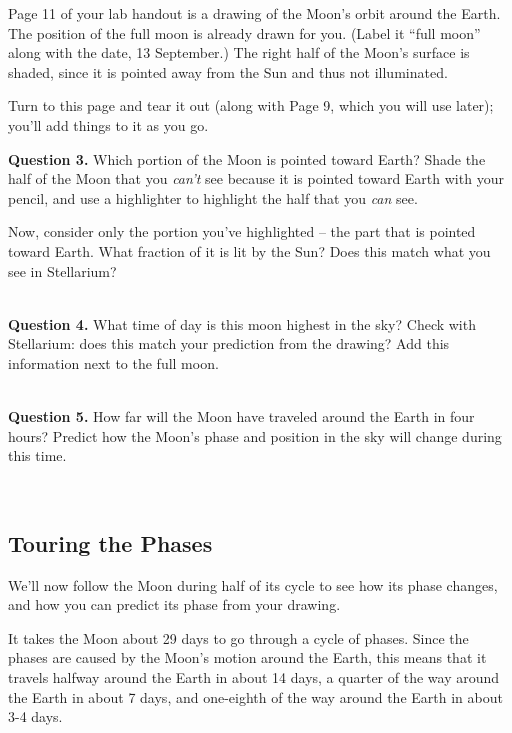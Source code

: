 \documentclass[11pt]{article}
\begin{document}
\newpage


Page 11 of your lab handout is a drawing of the Moon's orbit around the Earth. The position 
of the full moon is already drawn for you. (Label it ``full moon'' along with the date, 13 September.) The right half of the Moon's surface is shaded, since it is pointed away from the Sun and thus not illuminated.

Turn to this page and tear it out (along with Page 9, which you will use later); you'll add things to it as you go.\vspace{1cm}

\textbf{Question 3.} Which portion of the Moon is pointed toward Earth? Shade the half of the Moon that you {\it can't}
see because it is pointed toward Earth with your pencil, and use a highlighter to highlight the half that you {\it can} see.

Now, consider only the portion you've highlighted -- the part that is pointed toward Earth. What fraction of it is lit 
by the Sun? Does this match what you see in Stellarium?

\vspace*{1.5cm}

\hrulefill\\

\textbf{Question 4.} What time of day is this moon highest in the sky? Check with Stellarium: does this match your 
prediction from the drawing? Add this information next to the full moon.

\vspace*{1.5cm}

\hrulefill\\

\textbf{Question 5.} How far will the Moon have traveled around the Earth in four hours? Predict how the Moon's phase and position
in the sky will change during this time. 

\vspace*{1.5cm}

\hrulefill\\


\subsection{Touring the Phases}


We'll now follow the Moon during half of its cycle to see how its phase changes, and how you can predict its phase from your drawing.

It takes the Moon about 29 days to go through a cycle of phases. Since the phases are caused by the Moon's motion around the Earth,
this means that it travels halfway around the Earth in about 14 days, a quarter of the way around the Earth in about 7 days, and one-eighth of the way around the Earth in about 3-4 days.
\end{document}
